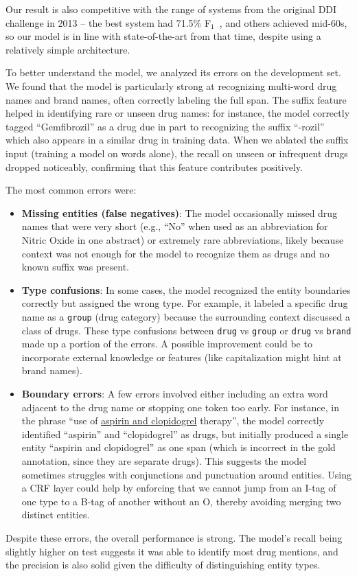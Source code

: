 Our result is also competitive with the range of systems from the original DDI challenge in 2013 – the best system had 71.5\% F$_1$~\cite{semeval2013}, and others achieved mid-60s, so our model is in line with state-of-the-art from that time, despite using a relatively simple architecture.

To better understand the model, we analyzed its errors on the development set. We found that the model is particularly strong at recognizing multi-word drug names and brand names, often correctly labeling the full span. The suffix feature helped in identifying rare or unseen drug names: for instance, the model correctly tagged ``Gemfibrozil'' as a drug due in part to recognizing the suffix ``-rozil'' which also appears in a similar drug in training data. When we ablated the suffix input (training a model on words alone), the recall on unseen or infrequent drugs dropped noticeably, confirming that this feature contributes positively.

The most common errors were:
\begin{itemize}
    \item \textbf{Missing entities (false negatives)}: The model occasionally missed drug names that were very short (e.g., ``No'' when used as an abbreviation for Nitric Oxide in one abstract) or extremely rare abbreviations, likely because context was not enough for the model to recognize them as drugs and no known suffix was present.
    \item \textbf{Type confusions}: In some cases, the model recognized the entity boundaries correctly but assigned the wrong type. For example, it labeled a specific drug name as a \texttt{group} (drug category) because the surrounding context discussed a class of drugs. These type confusions between \texttt{drug} vs \texttt{group} or \texttt{drug} vs \texttt{brand} made up a portion of the errors. A possible improvement could be to incorporate external knowledge or features (like capitalization might hint at brand names).
    \item \textbf{Boundary errors}: A few errors involved either including an extra word adjacent to the drug name or stopping one token too early. For instance, in the phrase ``use of \underline{aspirin and clopidogrel} therapy'', the model correctly identified ``aspirin'' and ``clopidogrel'' as drugs, but initially produced a single entity ``aspirin and clopidogrel'' as one span (which is incorrect in the gold annotation, since they are separate drugs). This suggests the model sometimes struggles with conjunctions and punctuation around entities. Using a CRF layer could help by enforcing that we cannot jump from an I-tag of one type to a B-tag of another without an O, thereby avoiding merging two distinct entities.
\end{itemize}

Despite these errors, the overall performance is strong. The model's recall being slightly higher on test suggests it was able to identify most drug mentions, and the precision is also solid given the difficulty of distinguishing entity types. 